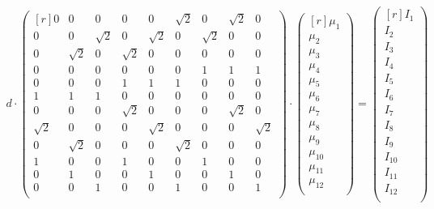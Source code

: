 \begin{align}

    d \cdot

    \begin{pmatrix}[r]
      0 & 0 & 0 & 0 & 0 & \sqrt{2} & 0 & \sqrt{2} & 0 \\
      0 & 0 & \sqrt{2} & 0 & \sqrt{2} & 0 & \sqrt{2} & 0 & 0 \\
      0 & \sqrt{2} & 0 & \sqrt{2} & 0 & 0 & 0 & 0 & 0 \\
      0 & 0 & 0 & 0 & 0 & 0 & 1 & 1 & 1 \\
      0 & 0 & 0 & 1 & 1 & 1 & 0 & 0 & 0 \\
      1 & 1 & 1 & 0 & 0 & 0 & 0 & 0 & 0 \\
      0 & 0 & 0 & \sqrt{2} & 0 & 0 & 0  & \sqrt{2} & 0 \\
      \sqrt{2} & 0 & 0 & 0 & \sqrt{2} & 0 & 0 & 0 & \sqrt{2} \\
      0 & \sqrt{2} & 0 & 0 & 0  & \sqrt{2} & 0 & 0 & 0\\
      1 & 0 & 0 & 1 & 0 & 0 & 1 & 0 & 0 \\
      0 & 1 & 0 & 0 & 1 & 0 & 0 & 1 & 0 \\
      0 & 0 & 1 & 0 & 0 & 1 & 0 & 0 & 1 \\
    \end{pmatrix}

    \cdot

    \begin{pmatrix}[r]

      \mu_1 \\
      \mu_2 \\
      \mu_3 \\
      \mu_4 \\
      \mu_5 \\
      \mu_6 \\
      \mu_7 \\
      \mu_8 \\
      \mu_9 \\
      \mu_10 \\
      \mu_11 \\
      \mu_12 \\

    \end{pmatrix}

    =

    \begin{pmatrix}[r]

      I_1 \\
      I_2 \\
      I_3 \\
      I_4 \\
      I_5 \\
      I_6 \\
      I_7 \\
      I_8 \\
      I_9 \\
      I_10 \\
      I_11 \\
      I_12 \\


\end{pmatrix}
\end{align}
